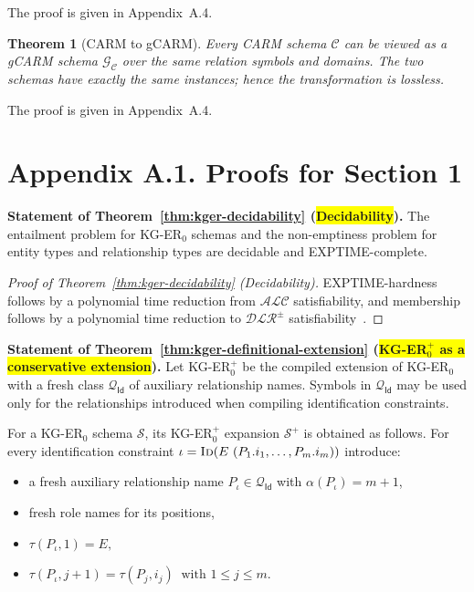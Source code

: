 \documentclass[10pt]{article}
\newtheorem{theorem}{Theorem}
\begin{document}
The proof is given in Appendix~A.4.


\begin{theorem}[\textsf{CARM} to \textsf{gCARM}]
\label{thm:carm-to-gcarm}
Every \textsf{CARM} schema $\mathcal C$ can be viewed as a
\textsf{gCARM} schema $\mathcal G_{\mathcal C}$ over the same relation
symbols and domains.  The two schemas have exactly the same instances;
hence the transformation is lossless.
\end{theorem}

The proof is given in Appendix~A.4.



\newpage
\section*{Appendix A.1. Proofs for Section 1}

\noindent\textbf{Statement of Theorem~\ref{thm:kger-decidability} (\colorbox{yellow}{\textbf{Decidability}}).}
The entailment problem for KG-ER$_0$ schemas and the non-emptiness
problem for entity types and relationship types are decidable and
EXPTIME-complete.

\begin{proof}[Proof of Theorem~\ref{thm:kger-decidability} (Decidability)]
EXPTIME-hardness follows by a polynomial time reduction from
\(\mathcal{ALC}\) satisfiability, and membership follows by a polynomial
time reduction to \(\mathcal{DLR}^{\pm}\)
satisfiability~\cite{DBLP:conf/birthday/ArtaleF19}.
\end{proof}

\noindent\textbf{Statement of Theorem~\ref{thm:kger-definitional-extension} (\colorbox{yellow}{KG-ER\(_0^+\) as a conservative extension}).}
Let KG-ER\(_0^+\) be the compiled extension of KG-ER\(_0\) with a fresh
class \(\mathcal Q_{\mathsf{Id}}\) of auxiliary relationship names.
Symbols in \(\mathcal Q_{\mathsf{Id}}\) may be used only for the
relationships introduced when compiling identification constraints.  

For a KG-ER\(_0\) schema \(\mathcal S\), its KG-ER\(_0^+\) expansion
\(\mathcal S^+\) is obtained as follows.  For every identification
constraint
\(
\iota=\textsc{Id}(E\ (P_1.i_1,\ldots,P_m.i_m))
\)
introduce:
\begin{itemize}
	\item a fresh auxiliary relationship name
\(P_\iota\in\mathcal Q_{\mathsf{Id}}\) with
\(\alpha(P_\iota)=m+1\),
	\item fresh role names for its positions,
	\item $\tau(P_\iota,1)=E,$
	\item $\tau(P_\iota,j+1)=\tau(P_j,i_j) ~\text{ with } 1\leq j\leq m.$
\end{itemize}
\end{document}
